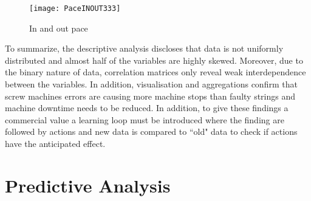\documentclass[runningheads]{llncs}
\begin{document}
\begin{figure}
\centering
\texttt{[image: PaceINOUT333]} 
\caption{In and out pace}
\label{fig:pace}
\end{figure}

To summarize, the descriptive analysis discloses that data is not uniformly distributed and almost half of the variables are highly skewed. Moreover, due to the binary nature of data, correlation matrices only reveal weak interdependence between the variables. In addition, visualisation and aggregations confirm that screw machines errors are causing more machine stops than faulty strings and machine downtime needs to be reduced. In addition, to give these findings a commercial value a learning loop must be introduced where the finding are followed by actions and new data is compared to ``old" data to check if actions have the anticipated effect.
  


 












\section {Predictive Analysis}
\label{sec:modeling}






\iffalse

supervised approach
unsupervised approach
semi-supervised approach
Various forecasting methods will be used to predict patterns. Pre-dictive data analysis and modeling includes unsupervised and supervised machine learning, statistical in-ference, and prediction. A wide variety of machine learning algorithms are available, including k-nearest neighbors, naïve Bayes, decision trees, support vector machines, logistic regression, k-means, and so on. The choice of method to be deployed depends on the problem definition discussed in the first step and the type of collected data. The final product of this step is a model inferred from the data.

choose a model from the given approach
determine model assumptions
prepare input data
\fi
\end{document}
